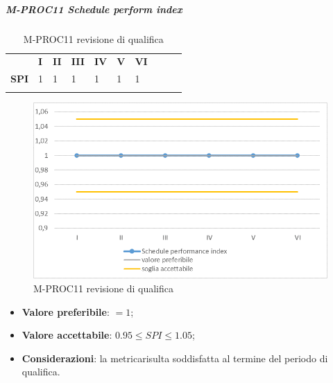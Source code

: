 \subparagraph{M-PROC11 Schedule perform index} \mbox{}
\begin{longtable}[H!] {						
		>{}p{50mm}  		
		>{}p{8mm}
		>{}p{8mm}		
		>{}p{8mm}		
		>{}p{8mm}		
		>{}p{8mm}		
		>{}p{8mm}
		>{}p{8mm}
		>{}p{8mm}
		>{}p{8mm}
	}
	\rowcolor{gray!50}
	\textbf{} & \textbf{I} & \textbf{II} & \textbf{III} & \textbf{IV} & \textbf{V} & \textbf{VI} \TBstrut \\ [2mm]
	\textbf{SPI} & 1 & 1 & 1 & 1 & 1 & 1 \TBstrut \\ [2mm]
	\rowcolor{white}
	\caption{M-PROC11 revisione di qualifica}
\end{longtable}
\begin{figure}[H] 	
	\includegraphics[width=\linewidth]{./img/grafici/RQ11.png}	
	\caption{M-PROC11 revisione di qualifica}	
\end{figure}
	\begin{itemize}
		\item \textbf{Valore preferibile}: $=1$;
		\item \textbf{Valore accettabile}: $0.95 \le SPI \le 1.05$;
		\item \textbf{Considerazioni}: la metrica\glosp risulta soddisfatta al termine del periodo di qualifica.
	\end{itemize}

